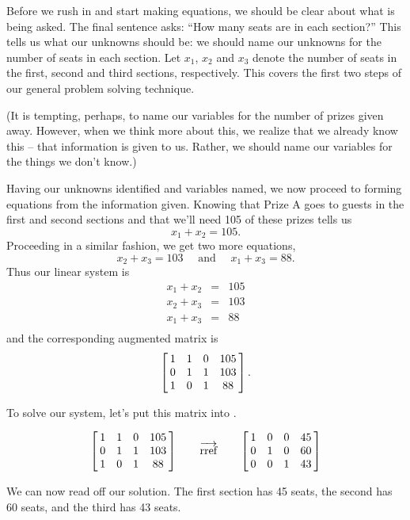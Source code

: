 {Before we rush in and start making equations, we should be clear about what is being asked. The final sentence asks: ``How many seats are in each section?'' This tells us what our unknowns should be: we should name our unknowns for the number of seats in each section. Let $x_1$, $x_2$ and $x_3$ denote the number of seats in the first, second and third sections, respectively. This covers the first two steps of our general problem solving technique.

(It is tempting, perhaps, to name our variables for the number of prizes given away. However, when we think more about this, we realize that we already know this -- that information is given to us. Rather, we should name our variables for the things we don't know.)

Having our unknowns identified and variables named, we now proceed to forming equations from the information given. Knowing that Prize A goes to guests in the first and second sections and that we'll need 105 of these prizes tells us $$x_1+x_2 = 105.$$ Proceeding in a similar fashion, we get two more equations, $$x_2+x_3 = 103\quad\text{ and }\quad x_1+x_3 = 88.$$ Thus our linear system is $$\begin{array}{rcl}x_1+x_2&=&105\\x_2+x_3&=&103\\x_1+x_3&=&88\\ \end{array}$$ and the corresponding augmented matrix is $$\bmx{cccc}1&1&0&105\\0&1&1&103\\1&0&1&88\\ \emx.$$

To solve our system, let's put this matrix into \rref.

$$\bmx{cccc}1&1&0&105\\0&1&1&103\\1&0&1&88\\ \emx \quad \quad \overrightarrow{\text{rref}} \quad\quad \bmx{cccc}1&0&0&45\\0&1&0&60\\0&0&1&43\\ \emx$$

We can now read off our solution. The first section has 45 seats, the second has 60 seats, and the third has 43 seats.}\\ %


